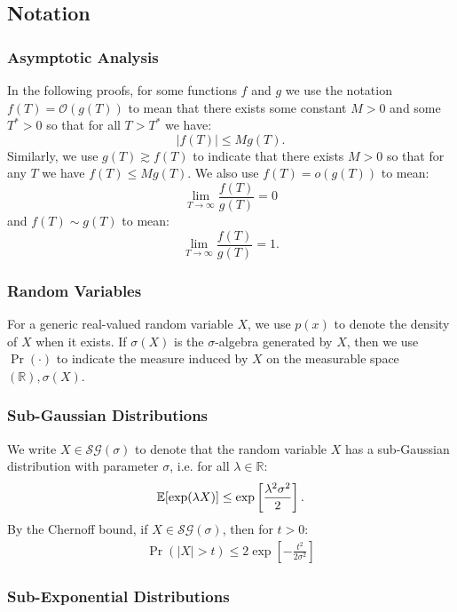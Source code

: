 \subsection{Notation}
\label{app:notation}

\subsubsection{Asymptotic Analysis} 

In the following proofs, for some functions $f$ and $g$ we use the notation $f(T) = \mathcal{O}(g(T))$ to mean that there exists some constant $M > 0$ and some $T^* > 0$ so that for all $T > T^*$ we have: $$|f(T)| \leq M g(T).$$ Similarly, we use $g(T) \gtrsim f(T)$ to indicate that there exists $M > 0$ so that for any $T$ we have $f(T) \leq M g(T).$ We also use $f(T) = o(g(T))$ to mean:$$\lim_{T\to\infty} \frac{f(T)}{g(T)} = 0$$ and $f(T) \sim g(T)$ to mean: $$\lim_{T\to\infty} \frac{f(T)}{g(T)} = 1.$$ 

\subsubsection{Random Variables} 

For a generic real-valued random variable $X$, we use $p(x)$ to denote the density of $X$ when it exists. If $\sigma(X)$ is the $\sigma$-algebra generated by $X$, then we use $\Pr(\cdot)$ to indicate the measure induced by $X$ on the measurable space $(\mathbb{R}),\sigma(X)$.

\subsubsection{Sub-Gaussian Distributions}

We write $X\in\mathcal{SG}(\sigma)$ to denote that the random variable $X$ has a sub-Gaussian distribution with parameter $\sigma$, i.e. for all $\lambda \in \mathbb{R}$: 
\begin{align*}
    \mathbb{E}[\exp(\lambda X)] \leq \exp\left[\frac{\lambda^2\sigma^2}{2}\right].
\end{align*}
By the Chernoff bound, if $X\in\mathcal{SG}(\sigma)$, then for $t > 0$:
\begin{align*}
    \Pr(|X| > t) \leq 2\exp\left[-\frac{t^2}{2\sigma^2}\right]
\end{align*}

\subsubsection{Sub-Exponential Distributions}

